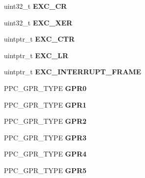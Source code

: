 \begin{DoxyCompactItemize}
uint32\+\_\+t {\bfseries E\+X\+C\+\_\+\+CR}
\item 
\mbox{\label{structCPU__Interrupt__frame_a15e7a7f90a48230a9c35ba09f8885c2a}} 
uint32\+\_\+t {\bfseries E\+X\+C\+\_\+\+X\+ER}
\item 
\mbox{\label{structCPU__Interrupt__frame_ad45af29452f6b1c6b087bee38f8e7c40}} 
uintptr\+\_\+t {\bfseries E\+X\+C\+\_\+\+C\+TR}
\item 
\mbox{\label{structCPU__Interrupt__frame_ad2ef8944e857329743d5c26a7f83aaa1}} 
uintptr\+\_\+t {\bfseries E\+X\+C\+\_\+\+LR}
\item 
\mbox{\label{structCPU__Interrupt__frame_a02f14f3388350944c9c612e96bf25779}} 
uintptr\+\_\+t {\bfseries E\+X\+C\+\_\+\+I\+N\+T\+E\+R\+R\+U\+P\+T\+\_\+\+F\+R\+A\+ME}
\item 
\mbox{\label{structCPU__Interrupt__frame_a4ea9951d993b3b68601a51f97121a60b}} 
P\+P\+C\+\_\+\+G\+P\+R\+\_\+\+T\+Y\+PE {\bfseries G\+P\+R0}
\item 
\mbox{\label{structCPU__Interrupt__frame_a286ae1999f06dea2239743083c7c952a}} 
P\+P\+C\+\_\+\+G\+P\+R\+\_\+\+T\+Y\+PE {\bfseries G\+P\+R1}
\item 
\mbox{\label{structCPU__Interrupt__frame_aeb4e97e39cf0550afd032fadf9d60425}} 
P\+P\+C\+\_\+\+G\+P\+R\+\_\+\+T\+Y\+PE {\bfseries G\+P\+R2}
\item 
\mbox{\label{structCPU__Interrupt__frame_a854d057747018d60abad0ca7fcc0fca1}} 
P\+P\+C\+\_\+\+G\+P\+R\+\_\+\+T\+Y\+PE {\bfseries G\+P\+R3}
\item 
\mbox{\label{structCPU__Interrupt__frame_a01b9604ee853a0fe97cee1fb2b243fbc}} 
P\+P\+C\+\_\+\+G\+P\+R\+\_\+\+T\+Y\+PE {\bfseries G\+P\+R4}
\item 
\mbox{\label{structCPU__Interrupt__frame_aa1541cfa1f877e8296029d1470c2da09}} 
P\+P\+C\+\_\+\+G\+P\+R\+\_\+\+T\+Y\+PE {\bfseries G\+P\+R5}

\end{DoxyCompactItemize}
